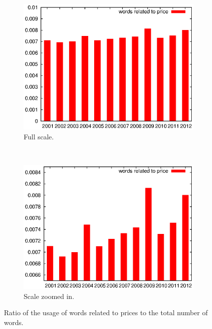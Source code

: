     \begin{figure}[H]
      \centering
      \begin{subfigure}[H]{0.7\textwidth}
        \includegraphics[width=\textwidth]{chapters/03_implementation/yearly_price1}
        \caption{Full scale.}
        \label{fig:dist_price_year_1}
      \end{subfigure}
      \\
      \begin{subfigure}[H]{0.7\textwidth}
        \includegraphics[width=\textwidth]{chapters/03_implementation/yearly_price2}
        \caption{Scale zoomed in.}
        \label{fig:dist_price_year_2}
      \end{subfigure}
      \caption{Ratio of the usage of words related to prices to the total number of words.}
      \label{fig:dist_price_year}
    \end{figure}
    
